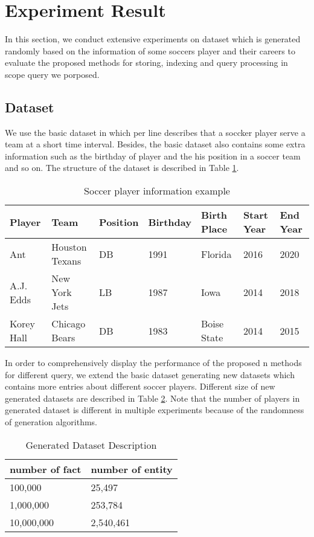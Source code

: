 
\section{Experiment Result}\label{Experiment Result}
In this section, we conduct extensive experiments on dataset which is generated 
randomly based on the information of some soccers player and their careers to 
evaluate the proposed methods for storing, indexing and query processing in scope 
query we porposed.

\subsection{Dataset}
We use the basic dataset in which per line describes that a soccker player serve a team
at a short time interval. Besides, the basic dataset also contains some  extra information 
such as the birthday of player and the his position in a soccer team and so on. The 
structure of the dataset is described in Table \ref{basic_data}.

\begin{table}
	\centering
	\caption{Soccer player information example}
	\label{basic_data}
	\begin{small}
		\begin{tabular}{p{1.6cm}|p{2.5cm}|p{1.2cm}|p{1.3cm}|p{1.7cm}|p{1.5cm}|p{1.5cm}}
			\hline
			Player & Team & Position & Birthday & Birth Place & Start Year & End Year\\ \hline
			Ant & Houston Texans & DB & 1991 & Florida & 2016 & 2020 \\\hline
			A.J. Edds & New York Jets & LB & 1987 & Iowa & 2014 & 2018 \\\hline
			Korey Hall & Chicago Bears & DB & 1983 & Boise State & 2014 & 2015 \\\hline
		\end{tabular}
	\end{small}
\end{table}

In order to comprehensively display the performance of the proposed n methods for different query, 
we extend the basic dataset generating new datasets which contains more entries about different 
soccer players. Different size of new generated datasets are described in Table \ref{gen_data}. Note that 
the number of players in generated dataset is different in multiple experiments because of the randomness 
of generation algorithms.

\begin{table}
	\centering
	\caption{Generated Dataset Description}
	\label{gen_data}
	\begin{small}
		\begin{tabular}{p{4cm}|p{3cm}}
			\hline
			number of fact  & number of entity \\\hline
			100,000 & 25,497 \\\hline
			1,000,000 &  253,784 \\\hline
			10,000,000 & 2,540,461 \\\hline
		\end{tabular}
	\end{small}
\end{table}


